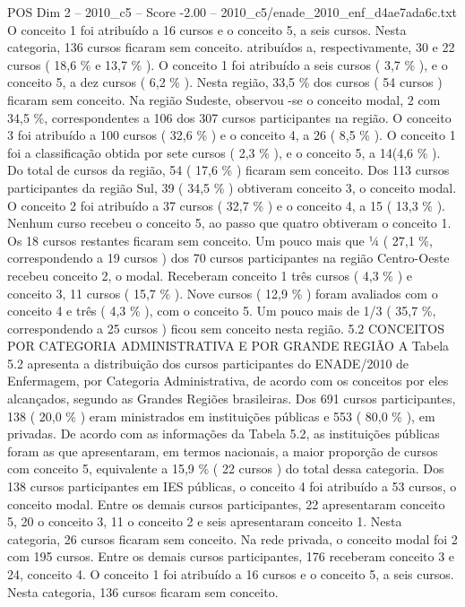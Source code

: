 \begin{textsample}{POS Dim 2 – 2010\_c5 – Score -2.00 – 2010\_c5/enade\_2010\_enf\_d4ae7ada6c.txt}
O conceito 1 foi atribuído a 16 cursos e o conceito 5, a seis cursos.
Nesta categoria, 136 cursos ficaram sem conceito. atribuídos a, respectivamente, 30 e 22 cursos ( 18,6 \% e 13,7 \% ).
O conceito 1 foi atribuído a seis cursos ( 3,7 \% ), e o conceito 5, a dez cursos ( 6,2 \% ).
Nesta região, 33,5 \% dos cursos ( 54 cursos ) ficaram sem conceito.
Na região Sudeste, observou -se o conceito modal, 2 com 34,5 \%, correspondentes a 106 dos 307 cursos participantes na região.
O conceito 3 foi atribuído a 100 cursos ( 32,6 \% ) e o conceito 4, a 26 ( 8,5 \% ).
O conceito 1 foi a classificação obtida por sete cursos ( 2,3 \% ), e o conceito 5, a 14(4,6 \% ).
Do total de cursos da região, 54 ( 17,6 \% ) ficaram sem conceito.
Dos 113 cursos participantes da região Sul, 39 ( 34,5 \% ) obtiveram conceito 3, o conceito modal.
O conceito 2 foi atribuído a 37 cursos ( 32,7 \% ) e o conceito 4, a 15 ( 13,3 \% ).
Nenhum curso recebeu o conceito 5, ao passo que quatro obtiveram o conceito 1.
Os 18 cursos restantes ficaram sem conceito.
Um pouco mais que ¼ ( 27,1 \%, correspondendo a 19 cursos ) dos 70 cursos participantes na região Centro-Oeste recebeu conceito 2, o modal.
Receberam conceito 1 três cursos ( 4,3 \% ) e conceito 3, 11 cursos ( 15,7 \% ).
Nove cursos ( 12,9 \% ) foram avaliados com o conceito 4 e três ( 4,3 \% ), com o conceito 5.
Um pouco mais de 1/3 ( 35,7 \%, correspondendo a 25 cursos ) ficou sem conceito nesta região. 5.2 CONCEITOS POR CATEGORIA ADMINISTRATIVA E POR GRANDE REGIÃO A Tabela 5.2 apresenta a distribuição dos cursos participantes do ENADE/2010 de Enfermagem, por Categoria Administrativa, de acordo com os conceitos por eles alcançados, segundo as Grandes Regiões brasileiras.
Dos 691 cursos participantes, 138 ( 20,0 \% ) eram ministrados em instituições públicas e 553 ( 80,0 \% ), em privadas.
De acordo com as informações da Tabela 5.2, as instituições públicas foram as que apresentaram, em termos nacionais, a maior proporção de cursos com conceito 5, equivalente a 15,9 \% ( 22 cursos ) do total dessa categoria.
Dos 138 cursos participantes em IES públicas, o conceito 4 foi atribuído a 53 cursos, o conceito modal.
Entre os demais cursos participantes, 22 apresentaram conceito 5, 20 o conceito 3, 11 o conceito 2 e seis apresentaram conceito 1.
Nesta categoria, 26 cursos ficaram sem conceito.
Na rede privada, o conceito modal foi 2 com 195 cursos.
Entre os demais cursos participantes, 176 receberam conceito 3 e 24, conceito 4.
O conceito 1 foi atribuído a 16 cursos e o conceito 5, a seis cursos.
Nesta categoria, 136 cursos ficaram sem conceito.

\end{textsample}
